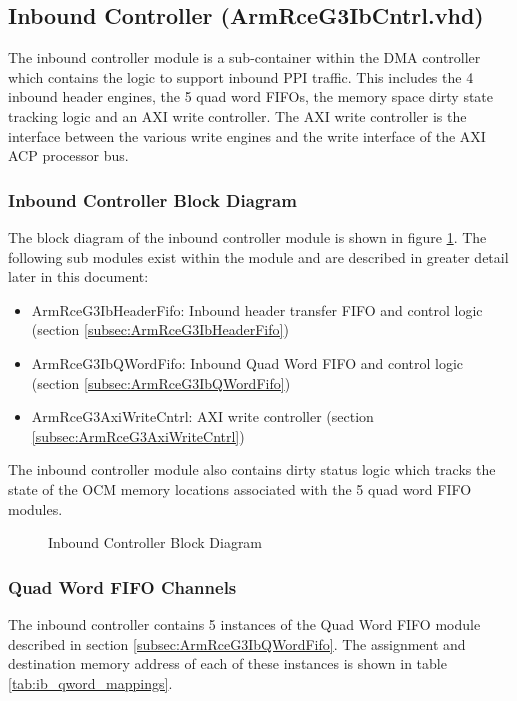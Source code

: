 \documentclass[11pt]{article}
\begin{document}
\subsection{Inbound Controller (ArmRceG3IbCntrl.vhd)}
\label{subsec:ArmRceG3IbCntrl}

The inbound controller module is a sub-container within the DMA controller which contains the logic to support inbound PPI traffic. 
This includes the 4 inbound header engines, the 5 quad word FIFOs, the memory space dirty state tracking logic and an AXI write controller.
The AXI write controller is the interface between the various write engines and the write interface of the AXI ACP processor bus. 

\subsubsection{Inbound Controller Block Diagram}

The block diagram of the inbound controller module is shown in figure \ref{fig:ib_cntrl_block}. The following sub modules
exist within the module and are described in greater detail later in this document:

\begin{itemize}
   \item ArmRceG3IbHeaderFifo: Inbound header transfer FIFO and control logic (section \ref{subsec:ArmRceG3IbHeaderFifo})
   \item ArmRceG3IbQWordFifo: Inbound Quad Word FIFO and control logic (section \ref{subsec:ArmRceG3IbQWordFifo})
   \item ArmRceG3AxiWriteCntrl: AXI write controller (section \ref{subsec:ArmRceG3AxiWriteCntrl})
\end{itemize}

The inbound controller module also contains dirty status logic which tracks the state of the OCM memory locations associated
with the 5 quad word FIFO modules.


\begin{figure}[H]
   \centering
   \caption{Inbound Controller Block Diagram}
   \label{fig:ib_cntrl_block}
\end{figure}

\subsubsection{Quad Word FIFO Channels}

The inbound controller contains 5 instances of the Quad Word FIFO module described in section \ref{subsec:ArmRceG3IbQWordFifo}. The assignment and destination
memory address of each of these instances is shown in table \ref{tab:ib_qword_mappings}.
\end{document}
